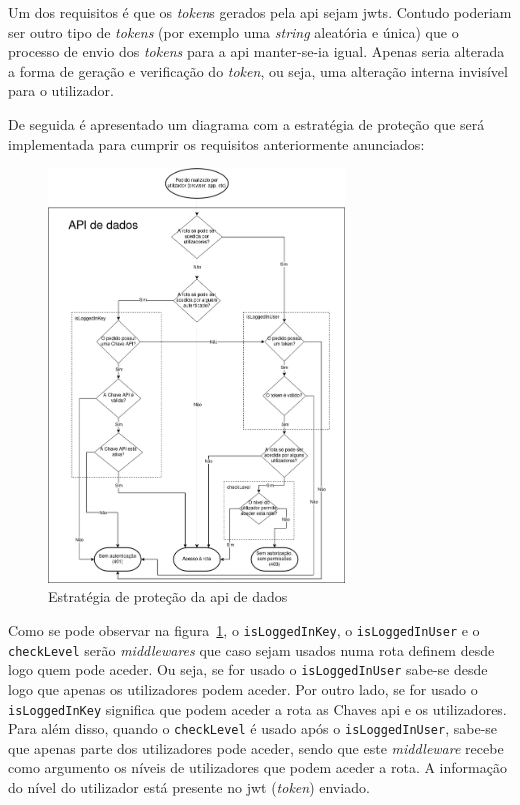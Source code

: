 Um dos requisitos é que os \textit{token}s gerados pela \acrshort{api} sejam \acrshort{jwt}s. Contudo poderiam ser outro tipo de \textit{tokens} (por exemplo uma \textit{string} aleatória e única) que o processo de envio dos \textit{tokens} para a \acrshort{api} manter-se-ia igual. Apenas seria alterada a forma de geração e verificação do \textit{token}, ou seja, uma alteração interna invisível para o utilizador.

De seguida é apresentado um diagrama com a estratégia de proteção que será implementada para cumprir os requisitos anteriormente anunciados:
\begin{figure}[H]
    \centering
    \includegraphics[width=0.7\textwidth]{img/protecaoStrag.png}
    \caption{Estratégia de proteção da \acrshort{api} de dados}\label{fig:protStrag}
\end{figure}

Como se pode observar na figura~\ref{fig:protStrag}, o \texttt{isLoggedInKey}, o \texttt{isLoggedInUser} e o \texttt{checkLevel} serão \textit{middlewares} que caso sejam usados numa rota definem desde logo quem pode aceder. Ou seja, se for usado o \texttt{isLoggedInUser} sabe-se desde logo que apenas os utilizadores podem aceder. Por outro lado, se for usado o \texttt{isLoggedInKey} significa que podem aceder a rota as Chaves \acrshort{api} e os utilizadores. Para além disso, quando o \texttt{checkLevel} é usado após o \texttt{isLoggedInUser}, sabe-se que apenas parte dos utilizadores pode aceder, sendo que este \textit{middleware} recebe como argumento os níveis de utilizadores que podem aceder a rota. A informação do nível do utilizador está presente no \acrshort{jwt} (\textit{token}) enviado.

